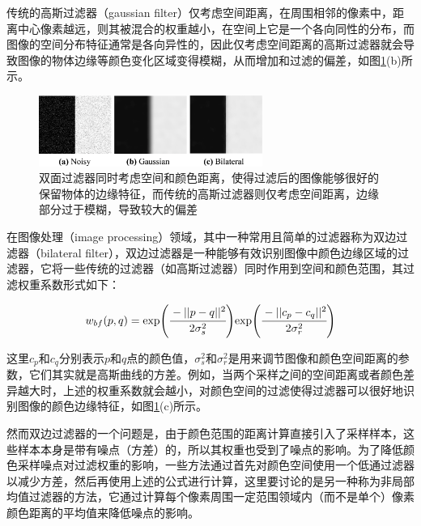 传统的高斯过滤器（gaussian filter）仅考虑空间距离，在周围相邻的像素中，距离中心像素越远，则其被混合的权重越小，在空间上它是一个各向同性的分布，而图像的空间分布特征通常是各向异性的，因此仅考虑空间距离的高斯过滤器就会导致图像的物体边缘等颜色变化区域变得模糊，从而增加和过滤的偏差，如图\ref{f:pt-gaussian-and-bilateral-filters}(b)所示。

\begin{figure}
\sidecaption
	\includegraphics[width=0.65\textwidth]{figures/pt/gaussian-and-bilateral-filters}
	\caption{双面过滤器同时考虑空间和颜色距离，使得过滤后的图像能够很好的保留物体的边缘特征，而传统的高斯过滤器则仅考虑空间距离，边缘部分过于模糊，导致较大的偏差}
	\label{f:pt-gaussian-and-bilateral-filters}
\end{figure}

在图像处理（image processing）领域，其中一种常用且简单的过滤器称为双边过滤器（bilateral filter）\cite{a:Bilateralfilteringforgrayandcolorimages,a:Ontheoriginofthebilateralfilterandwaystoimproveit}，双边过滤器是一种能够有效识别图像中颜色边缘区域的过滤器，它将一些传统的过滤器（如高斯过滤器）同时作用到空间和颜色范围，其过滤权重系数形式如下：

\begin{equation}
	w_{bf}(p,q)=\text{exp}\Biggl(  \cfrac{-||p-q||^{2}}{2\sigma^{2}_{s}}\Biggl)\text{exp}\Biggl(  \cfrac{-||c_p-c_q||^{2}}{2\sigma^{2}_{r}}\Biggl)
\end{equation}

\noindent 这里$c_p$和$c_q$分别表示$p$和$q$点的颜色值，$\sigma^{2}_s$和$\sigma^{2}_r$是用来调节图像和颜色空间距离的参数，它们其实就是高斯曲线的方差。例如，当两个采样之间的空间距离或者颜色差异越大时，上述的权重系数就会越小，对颜色空间的过滤使得过滤器可以很好地识别图像的颜色边缘特征，如图\ref{f:pt-gaussian-and-bilateral-filters}(c)所示。

然而双边过滤器的一个问题是，由于颜色范围的距离计算直接引入了采样样本，这些样本本身是带有噪点（方差）的，所以其权重也受到了噪点的影响。为了降低颜色采样噪点对过滤权重的影响，一些方法\cite{a:AnovelMonteCarlonoisereductionoperator}通过首先对颜色空间使用一个低通过滤器以减少方差，然后再使用上述的公式进行计算，这里要讨论的是另一种称为非局部均值过滤器\cite{a:Areviewofimagedenoisingalgorithmswithanewone}的方法，它通过计算每个像素周围一定范围领域内（而不是单个）像素颜色距离的平均值来降低噪点的影响。

